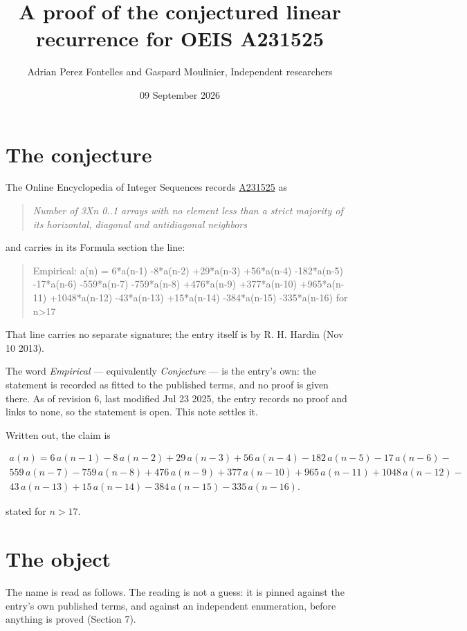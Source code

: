 \documentclass[11pt]{article}
\title{A proof of the conjectured linear recurrence for OEIS A231525}
\author{Adrian Perez Fontelles and Gaspard Moulinier, Independent researchers}
\date{09 September 2026}
\theoremstyle{definition}
\begin{document}
\maketitle
\section{The conjecture}

The Online Encyclopedia of Integer Sequences records \href{https://oeis.org/A231525}{A231525} as

\begin{quote}\itshape Number of 3Xn 0..1 arrays with no element less than a strict majority of its horizontal, diagonal and antidiagonal neighbors\end{quote}

and carries in its Formula section the line:

\begin{quote}\ttfamily Empirical: a(n) = 6*a(n-1) -8*a(n-2) +29*a(n-3) +56*a(n-4) -182*a(n-5) -17*a(n-6) -559*a(n-7) -759*a(n-8) +476*a(n-9) +377*a(n-10) +965*a(n-11) +1048*a(n-12) -43*a(n-13) +15*a(n-14) -384*a(n-15) -335*a(n-16) for n>17\end{quote}

That line carries no separate signature; the entry itself is by R. H. Hardin (Nov 10 2013).

The word {\itshape Empirical} --- equivalently {\itshape Conjecture} --- is the entry's own: the statement is recorded as fitted to the published terms, and no proof is given there. As of revision 6, last modified Jul 23 2025, the entry records no proof and links to none, so the statement is open. This note settles it.

Written out, the claim is

\begin{multline*} a(n) = 6\,a(n-1) - 8\,a(n-2) + 29\,a(n-3) + 56\,a(n-4) - 182\,a(n-5) - 17\,a(n-6) - \\ 559\,a(n-7) - 759\,a(n-8) + 476\,a(n-9) + 377\,a(n-10) + 965\,a(n-11) + 1048\,a(n-12) - \\ 43\,a(n-13) + 15\,a(n-14) - 384\,a(n-15) - 335\,a(n-16). \end{multline*}

stated for $n > 17$.

\section{The object}

The name is read as follows. The reading is not a guess: it is pinned against the entry's own published terms, and against an independent enumeration, before anything is proved (Section 7).
\end{document}
